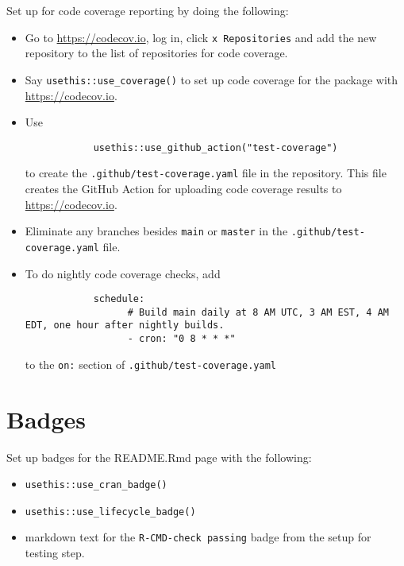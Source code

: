 \documentclass{article}
\begin{document}
Set up for code coverage reporting by doing the following:
%
\begin{itemize}

  \item Go to \url{https://codecov.io}, log in, click \verb|x Repositories| and add 
  		the new repository to the list of repositories for code coverage.
  
  \item Say \verb|usethis::use_coverage()| to set up code coverage 
		for the package with \url{https://codecov.io}.
  
  \item Use 
  		\begin{verbatim}
			usethis::use_github_action("test-coverage")
		\end{verbatim}
		to create the \verb|.github/test-coverage.yaml| file in the repository. 
		This file creates the GitHub Action for 
		uploading code coverage results to \url{https://codecov.io}.
		
  \item Eliminate any branches besides \texttt{main} or \texttt{master}
  		in the \verb|.github/test-coverage.yaml| file.
		
  \item To do nightly code coverage checks, add
  		\begin{verbatim}
			schedule:
				  # Build main daily at 8 AM UTC, 3 AM EST, 4 AM EDT, one hour after nightly builds.
				  - cron: "0 8 * * *"
  		\end{verbatim}
		to the \texttt{on:} section of \verb|.github/test-coverage.yaml|
		
\end{itemize}


\section{Badges}
\label{sec:badges}

Set up badges for the README.Rmd page with the following:

\begin{itemize}
	
  \item \verb|usethis::use_cran_badge()|

  \item \verb|usethis::use_lifecycle_badge()|
  
  \item markdown text for the \verb|R-CMD-check passing| badge from the setup for testing step.

\end{itemize}
\end{document}
